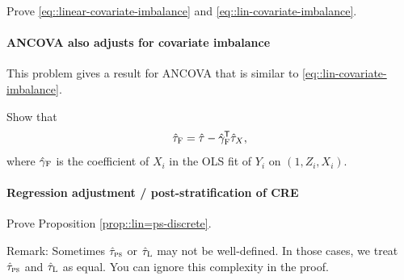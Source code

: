 Prove \eqref{eq::linear-covariate-imbalance} and \eqref{eq::lin-covariate-imbalance}. 
 
 
 
\paragraph{ANCOVA also adjusts for covariate imbalance}
\label{para::ancova-imbalance}

This problem gives a result for ANCOVA that is similar to \eqref{eq::lin-covariate-imbalance}. 

Show that
$$
\hat{\tau}_\textsc{F} =\hat\tau  - \hat\gamma_\textsc{F}^{\mkern-1.5mu\mathsf{T}} \hat\tau_X,
$$
where $ \hat\gamma_\textsc{F}$ is the coefficient of $X_i$ in the OLS fit of $Y_i$ on $(1,Z_i, X_i)$. 





 \paragraph{Regression adjustment / post-stratification of CRE}\label{para::lin=ps-discrete}
 
 Prove Proposition \ref{prop::lin=ps-discrete}. 
 
 
Remark:  Sometimes $\hat{\tau}_{\textsc{ps}}$ or $ \hat{\tau}_\textsc{L}$ may not be well-defined. In those cases, we treat $\hat{\tau}_{\textsc{ps}}$ and $ \hat{\tau}_\textsc{L}$ as equal. You can ignore this complexity in the proof. 
 
%
%
%


